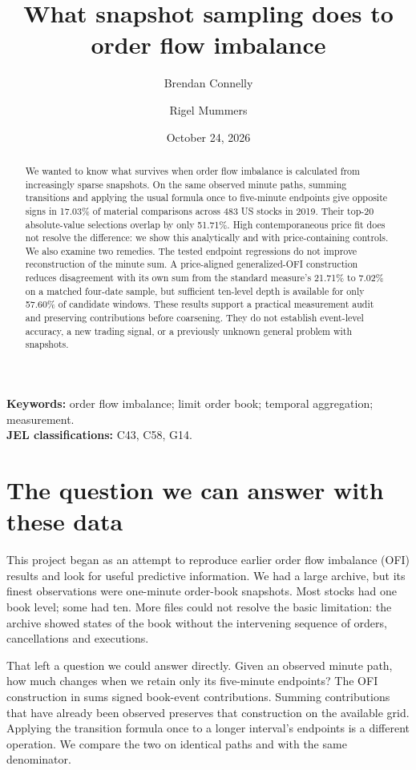 \documentclass[11pt]{article}
\title{What snapshot sampling does to order flow imbalance}
\author{Brendan Connelly \and Rigel Mummers}
\date{October 24, 2026}
\begin{document}
\maketitle
\begin{abstract}
We wanted to know what survives when order flow imbalance is calculated from increasingly sparse snapshots. On the same observed minute paths, summing transitions and applying the usual formula once to five-minute endpoints give opposite signs in 17.03\% of material comparisons across 483 US stocks in 2019. Their top-20 absolute-value selections overlap by only 51.71\%. High contemporaneous price fit does not resolve the difference: we show this analytically and with price-containing controls. We also examine two remedies. The tested endpoint regressions do not improve reconstruction of the minute sum. A price-aligned generalized-OFI construction reduces disagreement with its own sum from the standard measure's 21.71\% to 7.02\% on a matched four-date sample, but sufficient ten-level depth is available for only 57.60\% of candidate windows. These results support a practical measurement audit and preserving contributions before coarsening. They do not establish event-level accuracy, a new trading signal, or a previously unknown general problem with snapshots.
\end{abstract}
\noindent\textbf{Keywords:} order flow imbalance; limit order book; temporal aggregation; measurement.\\
\textbf{JEL classifications:} C43, C58, G14.

\section{The question we can answer with these data}
This project began as an attempt to reproduce earlier order flow imbalance (OFI) results and look for useful predictive information. We had a large archive, but its finest observations were one-minute order-book snapshots. Most stocks had one book level; some had ten. More files could not resolve the basic limitation: the archive showed states of the book without the intervening sequence of orders, cancellations and executions.

That left a question we could answer directly. Given an observed minute path, how much changes when we retain only its five-minute endpoints? The OFI construction in \citet{cks} sums signed book-event contributions. Summing contributions that have already been observed preserves that construction on the available grid. Applying the transition formula once to a longer interval's endpoints is a different operation. We compare the two on identical paths and with the same denominator.
\end{document}
